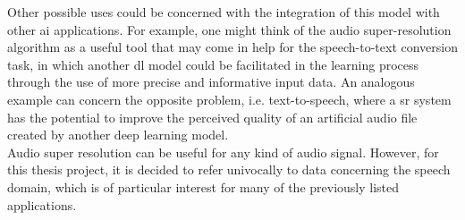 Other possible uses could be concerned with the integration of this model with other \gls{ai} applications. For example, one might think of the audio super-resolution algorithm as a useful tool that may come in help for the speech-to-text conversion task, in which another \gls{dl} model could be facilitated in the learning process through the use of more precise and informative input data. An analogous example can concern the opposite problem, i.e. text-to-speech, where a \gls{sr} system has the potential to improve the perceived quality of an artificial audio file created by another deep learning model. \\
Audio super resolution can be useful for any kind of audio signal. However, for this thesis project, it is decided to refer univocally to data concerning the speech domain, which is of particular interest for many of the previously listed applications.

